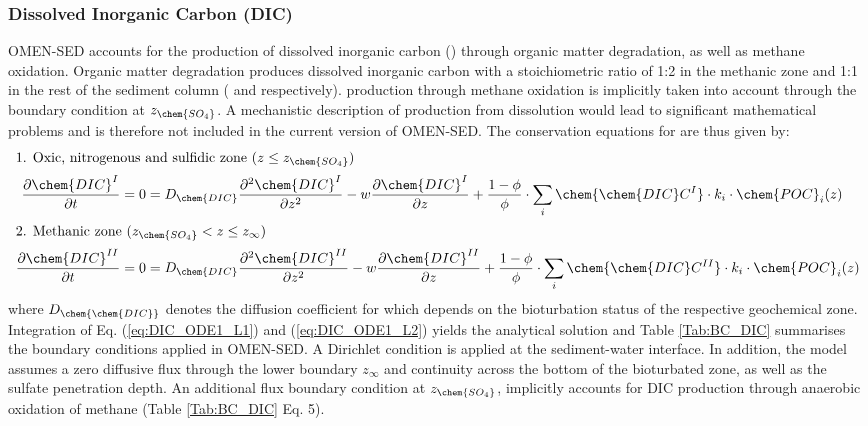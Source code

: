 \documentclass[gmd, manuscript]{copernicus}
\begin{document}
\subsubsection{Dissolved Inorganic Carbon (DIC)}\label{subsubsec:DIC}
OMEN-SED accounts for the production of dissolved inorganic carbon () through organic matter degradation, as well as methane oxidation. 
Organic matter degradation produces dissolved inorganic carbon with a stoichiometric  ratio of 1:2 in the methanic zone and 1:1 in the rest of the sediment column ( and  respectively). 
 production through methane oxidation is implicitly taken into account through the boundary condition at $z_{\chem{SO_4}}$. 
A mechanistic description of  production from  dissolution %
would lead to significant mathematical problems and is therefore not included in the current version of OMEN-SED. 
The conservation equations for  are thus given by:
\begin{align}
\intertext{1. Oxic, nitrogenous and sulfidic zone ($z \leq z_{\chem{SO_4}}$)}
  \frac{\partial \chem{DIC}^I}{\partial t} &= 0 = D_{\chem{DIC}} \frac{\partial^2\chem{DIC}^I }{\partial z^2} - w\frac{\partial \chem{DIC}^I }{\partial z} + \frac{1-\phi}{\phi} \cdot \sum_i \chem{\chem{DIC}C^I} \cdot k_i \cdot \chem{POC}_{i}(z)\label{eq:DIC_ODE1_L1}\\ %
 \intertext{2. Methanic zone ($z_{\chem{SO_4}} < z \leq z_\infty$)} 
  \frac{\partial \chem{DIC}^{II}}{\partial t} &= 0 = D_{\chem{DIC}} \frac{\partial^2\chem{DIC}^{II} }{\partial z^2} - w\frac{\partial \chem{DIC}^{II} }{\partial z} + \frac{1-\phi}{\phi} \cdot \sum_i \chem{\chem{DIC}C^{II}} \cdot k_i \cdot \chem{POC}_{i}(z)\label{eq:DIC_ODE1_L2} %
\end{align}
where $D_\chem{\chem{DIC}}$ denotes the diffusion coefficient for  which depends on the bioturbation status of the respective geochemical zone. 
Integration of Eq. (\ref{eq:DIC_ODE1_L1}) and (\ref{eq:DIC_ODE1_L2}) yields the analytical solution and Table \ref{Tab:BC_DIC} summarises the boundary conditions applied in OMEN-SED. 
A Dirichlet condition is applied at the sediment-water interface. In addition, the model assumes a zero diffusive flux through the lower boundary $z_\infty$ and continuity across the bottom of the bioturbated zone, as well as the sulfate penetration depth. An additional flux boundary condition at $z_{\chem{SO_4}}$, implicitly accounts for DIC production through anaerobic oxidation of methane  (Table \ref{Tab:BC_DIC} Eq. 5).
\end{document}
